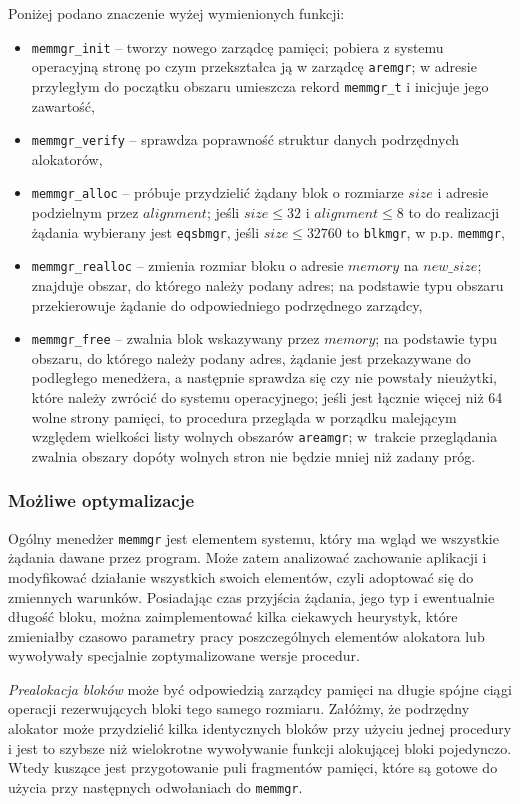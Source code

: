 \documentclass[12pt,a4paper,titlepage,twoside]{mwart}
\begin{document}
Poniżej podano znaczenie wyżej wymienionych funkcji:
\begin{itemize}
\item \verb+memmgr_init+ -- tworzy nowego zarządcę pamięci; pobiera z systemu
operacyjną stronę po czym przekształca ją w zarządcę \verb+aremgr+; w adresie
przyległym do początku obszaru umieszcza rekord \verb+memmgr_t+ i inicjuje jego
zawartość,
\item \verb+memmgr_verify+ -- sprawdza poprawność struktur danych podrzędnych
alokatorów,
\item \verb+memmgr_alloc+ -- próbuje przydzielić żądany blok o rozmiarze $size$
i adresie podzielnym przez $alignment$; jeśli $size \le 32$ i $alignment \le 8$
to do realizacji żądania wybierany jest \verb+eqsbmgr+, jeśli $size \le 32760$
to \verb+blkmgr+, w p.p. \verb+memmgr+,
\item \verb+memmgr_realloc+ -- zmienia rozmiar bloku o adresie $memory$ na
$new\_size$; znajduje obszar, do którego należy podany adres; na podstawie typu
obszaru przekierowuje żądanie do odpowiedniego podrzędnego zarządcy,
\item \verb+memmgr_free+ -- zwalnia blok wskazywany przez $memory$; na
podstawie typu obszaru, do którego należy podany adres, żądanie jest
przekazywane do podległego menedżera, a następnie sprawdza się czy nie powstały
nieużytki, które należy zwrócić do systemu operacyjnego; jeśli jest łącznie
więcej niż 64 wolne strony pamięci, to procedura przegląda w porządku malejącym
względem wielkości listy wolnych obszarów \verb+areamgr+; w~trakcie
przeglądania zwalnia obszary dopóty wolnych stron nie będzie mniej niż zadany próg.
\end{itemize}

\subsubsection{Możliwe optymalizacje}

Ogólny menedżer \texttt{memmgr} jest elementem systemu, który ma wgląd we
wszystkie żądania dawane przez program. Może zatem analizować zachowanie
aplikacji i modyfikować działanie wszystkich swoich elementów, czyli adoptować
się do zmiennych warunków.  Posiadając czas przyjścia żądania, jego typ i
ewentualnie długość bloku, można zaimplementować kilka ciekawych heurystyk,
które zmieniałby czasowo parametry pracy poszczególnych elementów alokatora lub
wywoływały specjalnie zoptymalizowane wersje procedur.

\textit{Prealokacja bloków} może być odpowiedzią zarządcy pamięci na długie
spójne ciągi operacji rezerwujących bloki tego samego rozmiaru. Załóżmy, że
podrzędny alokator może przydzielić kilka identycznych bloków przy użyciu
jednej procedury i jest to szybsze niż wielokrotne wywoływanie funkcji
alokującej bloki pojedynczo. Wtedy kuszące jest przygotowanie puli fragmentów
pamięci, które są gotowe do użycia przy następnych odwołaniach do \texttt{memmgr}.
\end{document}

